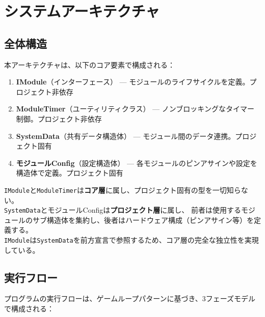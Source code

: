 \section{システムアーキテクチャ}

\subsection{全体構造}

本アーキテクチャは、以下のコア要素で構成される：

\begin{enumerate}
    \item \textbf{IModule}（インターフェース） — モジュールのライフサイクルを定義。プロジェクト非依存
    \item \textbf{ModuleTimer}（ユーティリティクラス） — ノンブロッキングなタイマー制御。プロジェクト非依存
    \item \textbf{SystemData}（共有データ構造体） — モジュール間のデータ連携。プロジェクト固有
    \item \textbf{モジュールConfig}（設定構造体） — 各モジュールのピンアサインや設定を構造体で定義。プロジェクト固有
\end{enumerate}

\begin{notebox}[コア層とプロジェクト層の分離]
\texttt{IModule}と\texttt{ModuleTimer}は\textbf{コア層}に属し、プロジェクト固有の型を一切知らない。\\
\texttt{SystemData}とモジュールConfigは\textbf{プロジェクト層}に属し、
前者は使用するモジュールのサブ構造体を集約し、後者はハードウェア構成（ピンアサイン等）を定義する。\\
\texttt{IModule}は\texttt{SystemData}を前方宣言で参照するため、コア層の完全な独立性を実現している。
\end{notebox}

\subsection{実行フロー}

プログラムの実行フローは、ゲームループパターンに基づき、3フェーズモデルで構成される：

